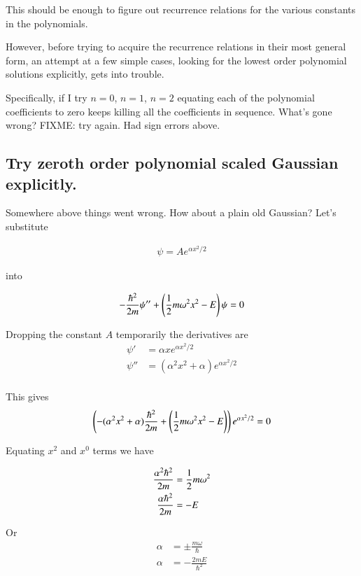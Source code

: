 \documentclass{article}
\begin{document}
This should be enough to figure out recurrence relations for the various constants in the polynomials.

However, before trying to acquire the recurrence relations in their most general form, an attempt at a few simple cases, looking for the lowest order
polynomial solutions explicitly, gets into trouble.

Specifically, if I try $n=0$, $n=1$, $n=2$ equating each of the polynomial coefficients to zero keeps killing all the coefficients in sequence.  What's 
gone wrong?  FIXME: try again.  Had sign errors above.

\subsection{Try zeroth order polynomial scaled Gaussian explicitly. }

Somewhere above things went wrong.  How about a plain old Gaussian?  Let's substitute 

\begin{align*}
\psi = A e^{\alpha x^2/2}
\end{align*}

into 

\begin{align*}
-\frac{\hbar^2}{2m} \psi'' + \left( \frac{1}{2}m \omega^2 x^2 - E \right) \psi = 0
\end{align*}

Dropping the constant $A$ temporarily the derivatives are
\begin{align*}
\psi' &= \alpha x e^{\alpha x^2/2} \\
\psi'' &= ( \alpha^2 x^2 + \alpha ) e^{\alpha x^2/2} \\
\end{align*}

This gives
\begin{align*}
\left( -( \alpha^2 x^2 + \alpha )\frac{\hbar^2}{2 m} + \left( \frac{1}{2}m \omega^2 x^2 - E \right) \right) e^{\alpha x^2/2} = 0
\end{align*}

Equating $x^2$ and $x^0$ terms we have

\begin{align*}
\frac{\alpha^2 \hbar^2}{2 m} &= \frac{1}{2}m \omega^2  \\
\frac{\alpha \hbar^2}{2 m} &= -E 
\end{align*}

Or
\begin{align*}
\alpha &= \pm \frac{ m \omega }{ \hbar }  \\
{\alpha } &= - \frac{2 m E }{\hbar^2}
\end{align*}
\end{document}
